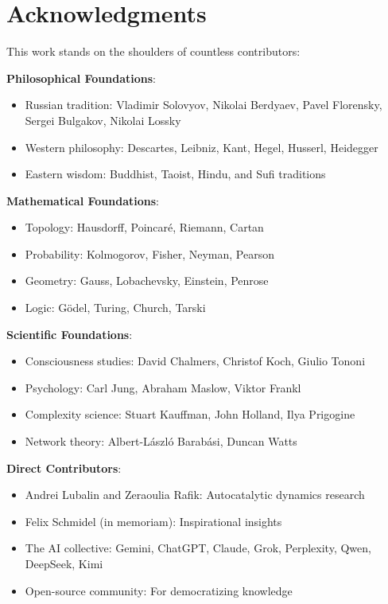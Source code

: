 \documentclass[11pt,a4paper]{article}
\theoremstyle{definition}
\theoremstyle{remark}
\begin{document}
\section{Acknowledgments}

This work stands on the shoulders of countless contributors:

\textbf{Philosophical Foundations}:
\begin{itemize}
\item Russian tradition: Vladimir Solovyov, Nikolai Berdyaev, Pavel Florensky, Sergei Bulgakov, Nikolai Lossky
\item Western philosophy: Descartes, Leibniz, Kant, Hegel, Husserl, Heidegger
\item Eastern wisdom: Buddhist, Taoist, Hindu, and Sufi traditions
\end{itemize}

\textbf{Mathematical Foundations}:
\begin{itemize}
\item Topology: Hausdorff, Poincaré, Riemann, Cartan
\item Probability: Kolmogorov, Fisher, Neyman, Pearson
\item Geometry: Gauss, Lobachevsky, Einstein, Penrose
\item Logic: Gödel, Turing, Church, Tarski
\end{itemize}

\textbf{Scientific Foundations}:
\begin{itemize}
\item Consciousness studies: David Chalmers, Christof Koch, Giulio Tononi
\item Psychology: Carl Jung, Abraham Maslow, Viktor Frankl
\item Complexity science: Stuart Kauffman, John Holland, Ilya Prigogine
\item Network theory: Albert-László Barabási, Duncan Watts
\end{itemize}

\textbf{Direct Contributors}:
\begin{itemize}
\item Andrei Lubalin and Zeraoulia Rafik: Autocatalytic dynamics research
\item Felix Schmidel (in memoriam): Inspirational insights
\item The AI collective: Gemini, ChatGPT, Claude, Grok, Perplexity, Qwen, DeepSeek, Kimi
\item Open-source community: For democratizing knowledge
\end{itemize}
\end{document}

